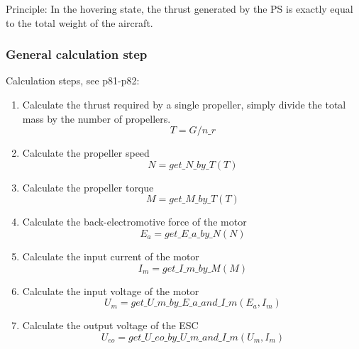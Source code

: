 \documentclass{article} %
\numberwithin{equation}{section} %
\begin{document}
Principle: In the hovering state, the thrust generated by the PS is exactly equal to the total weight of the aircraft.

\subsubsection{General calculation step}
Calculation steps, see \cite{qq} p81-p82:

\begin{enumerate}
\item Calculate the thrust required by a single propeller, simply divide the total mass by the number of propellers.
\begin{equation*}
T = G / n\_ r\label{q_hover.T}
\end{equation*}

\item Calculate the propeller speed
\begin{equation*}
N = get\_ N\_ by\_ T (T) \label{q_hover.N}
\end{equation*}

\item Calculate the propeller torque
\begin{equation*}
M = get\_ M\_ by\_ T (T) \label{q_hover.M}
\end{equation*}

\item Calculate the back-electromotive force of the motor
\begin{equation*}
E_a = get\_ E\_ a\_ by\_ N (N) \label{q_hover.E_a}
\end{equation*}

\item Calculate the input current of the motor
\begin{equation*}
I_m = get\_ I\_ m\_ by\_ M (M) \label{q_hover.I_m}
\end{equation*}

\item Calculate the input voltage of the motor
\begin{equation*}
U_m = get\_ U\_ m\_ by\_ E\_ a\_ and\_ I\_ m (E_a, I_m) \label{q_hover.U_m}
\end{equation*}

\item Calculate the output voltage of the ESC
\begin{equation*}
U_{eo} = get\_ U\_ eo\_ by\_ U\_ m\_ and\_ I\_ m (U_m, I_m) \label{q_hover.U_eo}
\end{equation*}


\end{enumerate}
\end{document}
